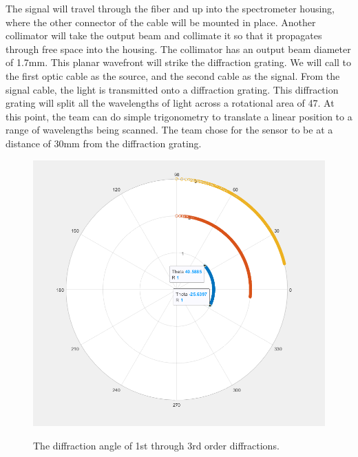 \documentclass[journal]{IEEEtran}
\begin{document}
The signal will travel through the fiber and up into the spectrometer housing, where the other connector of the cable will be mounted in place. Another collimator will take the output beam and collimate it so that it propagates through free space into the housing. The collimator has an output beam diameter of 1.7mm. This planar wavefront will strike the diffraction grating.
We will call to the first optic cable as the source, and the second cable as the signal. From the signal cable, the light is transmitted onto a diffraction grating. This diffraction grating will split all the wavelengths of light across a rotational area of 47\textdegree. At this point, the team can do simple trigonometry to translate a linear position to a range of wavelengths being scanned. The team chose for the sensor to be at a distance of 30mm from the diffraction grating.
\begin{figure}[H]
	\centering
	\includegraphics[width=\linewidth]{images/DiffractionAngleCalculator.png}
	\label{fig:diffraction-angle}
	\caption{The diffraction angle of 1st through 3rd order diffractions.}
\end{figure}
\end{document}
